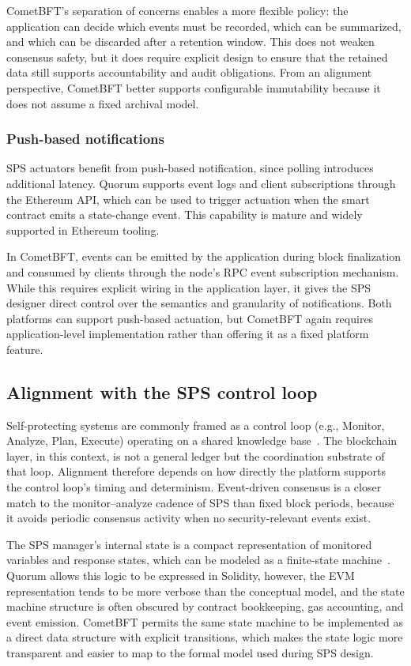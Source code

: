 CometBFT's separation of concerns enables a more flexible policy: the application can decide which events must be recorded, which can be summarized, and which can be discarded after a retention window. This does not weaken consensus safety, but it does require explicit design to ensure that the retained data still supports accountability and audit obligations. From an alignment perspective, CometBFT better supports configurable immutability because it does not assume a fixed archival model.

\subsubsection{Push-based notifications}
SPS actuators benefit from push-based notification, since polling introduces additional latency. Quorum supports event logs and client subscriptions through the Ethereum API, which can be used to trigger actuation when the smart contract emits a state-change event. This capability is mature and widely supported in Ethereum tooling.

In CometBFT, events can be emitted by the application during block finalization and consumed by clients through the node's RPC event subscription mechanism. While this requires explicit wiring in the application layer, it gives the SPS designer direct control over the semantics and granularity of notifications. Both platforms can support push-based actuation, but CometBFT again requires application-level implementation rather than offering it as a fixed platform feature.

\subsection{Alignment with the SPS control loop}
Self-protecting systems are commonly framed as a control loop (e.g., Monitor, Analyze, Plan, Execute) operating on a shared knowledge base~\cite{kephart2003vision, yuan2014systematic}. The blockchain layer, in this context, is not a general ledger but the coordination substrate of that loop. Alignment therefore depends on how directly the platform supports the control loop's timing and determinism. Event-driven consensus is a closer match to the monitor--analyze cadence of SPS than fixed block periods, because it avoids periodic consensus activity when no security-relevant events exist.

The SPS manager's internal state is a compact representation of monitored variables and response states, which can be modeled as a finite-state machine~\cite{iannucci2018model}. Quorum allows this logic to be expressed in Solidity, however, the EVM representation tends to be more verbose than the conceptual model, and the state machine structure is often obscured by contract bookkeeping, gas accounting, and event emission. CometBFT permits the same state machine to be implemented as a direct data structure with explicit transitions, which makes the state logic more transparent and easier to map to the formal model used during SPS design.

